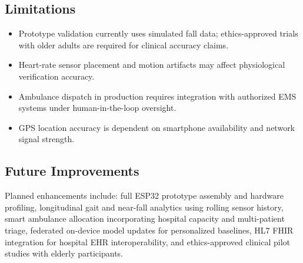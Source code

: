\subsection{Limitations}

\begin{itemize}
\item Prototype validation currently uses simulated fall data; ethics-approved trials with older adults are required for clinical accuracy claims.
\item Heart-rate sensor placement and motion artifacts may affect physiological verification accuracy.
\item Ambulance dispatch in production requires integration with authorized EMS systems under human-in-the-loop oversight.
\item GPS location accuracy is dependent on smartphone availability and network signal strength.
\end{itemize}

\subsection{Future Improvements}

Planned enhancements include: full ESP32 prototype assembly and hardware profiling, longitudinal gait and near-fall analytics using rolling sensor history, smart ambulance allocation incorporating hospital capacity and multi-patient triage, federated on-device model updates for personalized baselines, HL7 FHIR integration for hospital EHR interoperability, and ethics-approved clinical pilot studies with elderly participants.
